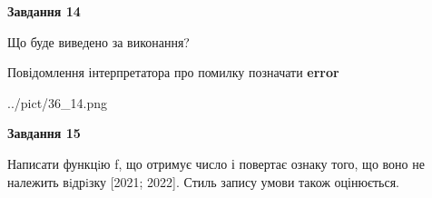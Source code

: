 \documentclass[11pt, ukrainian]{article}
\begin{document}
{\begin {large}
{\begin {center}\textbf{Завдання 14}\end {center}}\par
Що буде виведено за виконання? \par
Повідомлення інтерпретатора про помилку позначати \textbf{error}

\begin{center}
	{../pict/36_14.png}
\end{center}
\newpage

{\begin {center}\textbf{Завдання 15}\end {center}}\par

Написати функцiю f, що отримує число і повертає ознаку того, що воно не належить вiдрiзку [2021; 2022]. Стиль запису умови також оцінюється.\par
\newpage

\end {large}}
\end{document}
